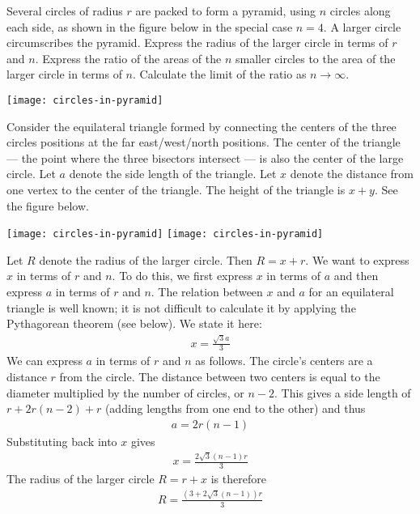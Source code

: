 \documentclass[12pt]{article}
\begin{document}
Several circles of radius $r$ are packed to form a pyramid, using $n$ circles along each side, as shown in the figure below in the special case $n=4$. A larger circle circumscribes the pyramid. Express the radius of the larger circle in terms of $r$ and $n$. Express the ratio of the areas of the $n$ smaller circles to the area of the larger circle in terms of $n$. Calculate the limit of the ratio as $n\rightarrow\infty$. 


\begin{center}
\texttt{[image: circles-in-pyramid]}
\end{center}

\begin{answer}
Consider the equilateral triangle formed by connecting the centers of the three circles positions at the far east/west/north positions. The center of the triangle --- the point where the three bisectors intersect --- is also the center of the large circle. Let $a$ denote the side length of the triangle. Let $x$ denote the distance from one vertex to the center of the triangle. The height of the triangle is $x+y$. See the figure below. 
\begin{center}
\texttt{[image: circles-in-pyramid]}%
\texttt{[image: circles-in-pyramid]}
\end{center}
Let $R$ denote the radius of the larger circle. Then $R=x+r$. We want to express $x$ in terms of $r$ and $n$. To do this, we first express $x$ in terms of $a$ and then express $a$ in terms of $r$ and $n$. The relation between $x$ and $a$ for an equilateral triangle is well known; it is not difficult to calculate it by applying the Pythagorean theorem (see below). We state it here: 
\begin{align*}
x = \frac{\sqrt{3}a}{3}
\end{align*}
We can express $a$ in terms of $r$ and $n$ as follows. The circle's centers are a distance $r$ from the circle. The distance between two centers is equal to the diameter multiplied by the number of circles, or $n-2$. This gives a side length of $r + 2r(n-2) + r$ (adding lengths from one end to the other) and thus
\begin{align*}
a =  2r(n-1)
\end{align*}
Substituting back into $x$ gives
\begin{align*}
x = \frac{2\sqrt{3}(n-1)r}{3}
\end{align*}
The radius of the larger circle $R=r+x$ is therefore 
\begin{align*}
R = \frac{\left(3+2\sqrt{3}(n-1)\right)r}{3}
\end{align*}


\end{answer}
\end{document}
